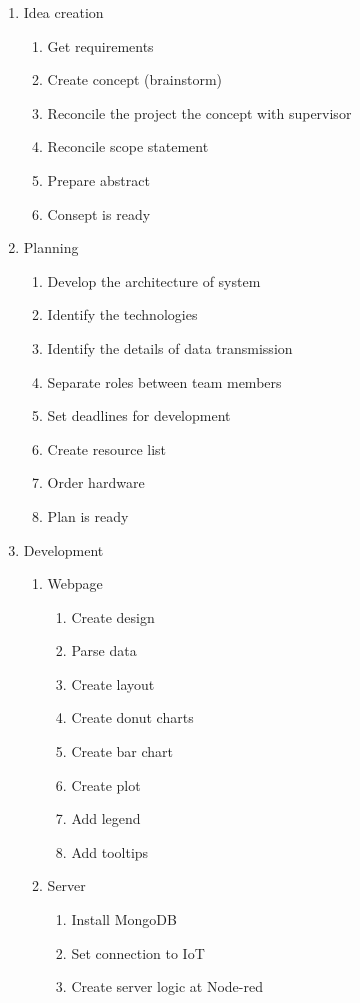 \documentclass[english]{article}
\begin{document}
\begin{enumerate}
\item Idea creation
	\begin{enumerate}[label*=\arabic*]
	\item Get requirements
	\item Create concept (brainstorm)
	\item Reconcile the project the concept with supervisor
	\item Reconcile scope statement
	\item Prepare abstract
	\item Consept is ready
	\end{enumerate}
\item Planning
	\begin{enumerate}[label*=\arabic*]
	\item Develop the architecture of system
	\item Identify the technologies
	\item Identify the details of data transmission
	\item Separate roles between team members
	\item Set deadlines for development
	\item Create resource list
	\item Order hardware
	\item Plan is ready
	\end{enumerate}
\item Development 
	\begin{enumerate}[label*=\arabic*]
	\item Webpage
		\begin{enumerate}[label*=\arabic*]
		\item Create design
		\item Parse data
		\item Create layout
		\item Create donut charts
		\item Create bar chart
		\item Create plot
		\item Add legend
		\item Add tooltips
		\end{enumerate}
	\item Server
		\begin{enumerate}[label*=\arabic*]
		\item Install MongoDB
		\item Set connection to IoT
		\item Create server logic at Node-red

\end{enumerate}
\end{enumerate}
\end{enumerate}
\end{document}
